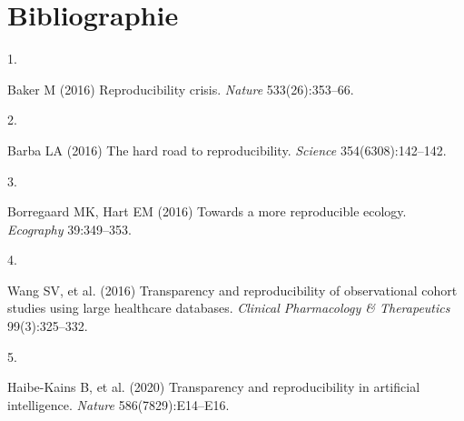 \documentclass[9pt,twocolumn,twoside,]{pnas-new}
\newlength{\cslhangindent}
\newlength{\csllabelwidth}
\newlength{\cslentryspacingunit} %
\newenvironment{CSLReferences}[2] %
 {%
  \setlength{\parindent}{0pt}
  \ifodd #1
  \let\oldpar\par
  \def\par{\hangindent=\cslhangindent\oldpar}
  \fi
  \setlength{\parskip}{#2\cslentryspacingunit}
 }%
 {}
\newcommand{\CSLLeftMargin}[1]{\parbox[t]{\csllabelwidth}{#1}}
\newcommand{\CSLRightInline}[1]{\parbox[t]{\linewidth - \csllabelwidth}{#1}\break}
\begin{document}
\newpage
\newpage

\hypertarget{bibliographie}{%
\section*{Bibliographie}\label{bibliographie}}

\hypertarget{refs}{}
\begin{CSLReferences}{0}{0}
\leavevmode{}%
\CSLLeftMargin{1. }
\CSLRightInline{Baker M (2016) Reproducibility crisis. \emph{Nature}
533(26):353--66.}

\leavevmode{}%
\CSLLeftMargin{2. }
\CSLRightInline{Barba LA (2016) The hard road to reproducibility.
\emph{Science} 354(6308):142--142.}

\leavevmode{}%
\CSLLeftMargin{3. }
\CSLRightInline{Borregaard MK, Hart EM (2016) Towards a more
reproducible ecology. \emph{Ecography} 39:349--353.}

\leavevmode{}%
\CSLLeftMargin{4. }
\CSLRightInline{Wang SV, et al. (2016) Transparency and reproducibility
of observational cohort studies using large healthcare databases.
\emph{Clinical Pharmacology \& Therapeutics} 99(3):325--332.}

\leavevmode{}%
\CSLLeftMargin{5. }
\CSLRightInline{Haibe-Kains B, et al. (2020) Transparency and
reproducibility in artificial intelligence. \emph{Nature}
586(7829):E14--E16.}

\end{CSLReferences}



% 
\end{document}

